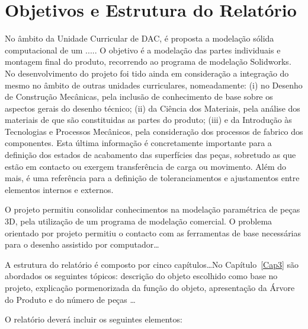 \cleardoublepage\chapter{Objetivos e Estrutura do Relatório}

No âmbito da Unidade Curricular de DAC, é proposta a modelação sólida
computacional de um ..... O objetivo é a modelação das partes individuais e
montagem final do produto, recorrendo ao programa de modelação Solidworks\textsuperscript{\tiny\textregistered}.
No desenvolvimento do projeto foi tido ainda em consideração a integração do
mesmo no âmbito de outras unidades curriculares, nomeadamente: (i) no Desenho
de Construção Mecânicas, pela inclusão de conhecimento de base sobre os
aspectos gerais do desenho técnico; (ii) da Ciência dos
Materiais, pela análise dos materiais de que são constituidas as
partes do produto; (iii) e da Introdução às Tecnologias e Processos
Mecânicos, pela consideração dos processos de fabrico dos componentes. Esta
última informação é concretamente importante para a definição dos estados de
acabamento das superfícies das peças, sobretudo as que estão em contacto ou
exergem transferência de carga ou movimento. Além do mais, é uma referência
para a definição de toleranciamentos e ajustamentos entre elementos internos
e externos.

O projeto permitiu consolidar conhecimentos na modelação paramétrica de peças
3D, pela utilização de um programa de modelação comercial. O problema
orientado por projeto permitiu o contacto com as ferramentas de base
necessárias para o desenho assistido por computador\ldots

A estrutura do relatório é composto por cinco capítulos\ldots No
Capítulo~\ref{Cap3}
são abordados os seguintes tópicos: descrição do objeto escolhido como
base no projeto, explicação pormenorizada da função do objeto, apresentação
da Árvore do Produto e do número de peças \ldots

\vspace{2cm}

O relatório deverá incluir os seguintes elementos:


